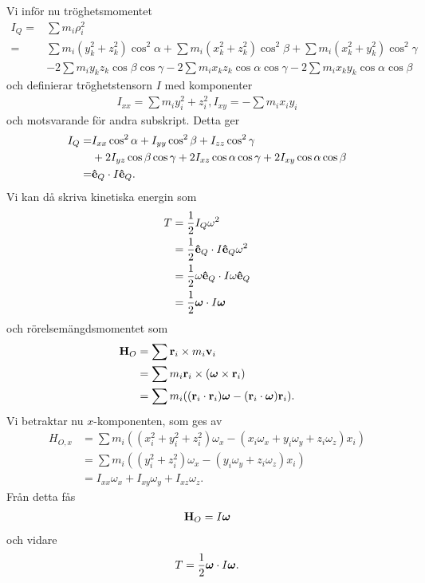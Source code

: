 Vi inför nu tröghetsmomentet
\begin{align*}
	I_{Q} =& \sum m_{i}\rho_{i}^2 \\
	      =& \sum m_{i}(y_{k}^2 + z_{k}^2)\cos^{2}{\alpha} + \sum m_{i}(x_{k}^2 + z_{k}^2)\cos^{2}{\beta} + \sum m_{i}(x_{k}^2 + y_{k}^2)\cos^{2}{\gamma} \\
	       &- 2\sum m_{i}y_{k}z_{k}\cos{\beta}\cos{\gamma} - 2\sum m_{i}x_{k}z_{k}\cos{\alpha}\cos{\gamma} - 2\sum m_{i}x_{k}y_{k}\cos{\alpha}\cos{\beta}
\end{align*}
och definierar tröghetstensorn $I$ med komponenter
\begin{align*}
	I_{xx} = \sum m_{i}y_{i}^2 + z_{i}^2, I _{xy} = -\sum m_{i}x_{i}y_{i} 
\end{align*}
och motsvarande för andra subskript. Detta ger
\begin{align*}
	I_{Q} =& I_{xx}\cos^{2}{\alpha} + I_{yy}\cos^{2}{\beta} + I_{zz}\cos^{2}{\gamma} \\
	       &+ 2I_{yz}\cos{\beta}\cos{\gamma} + 2I_{xz}\cos{\alpha}\cos{\gamma} + 2I_{xy}\cos{\alpha}\cos{\beta} \\
	      =& \vu{e}_{Q}\cdot I\vu{e}_{Q}.
\end{align*}
Vi kan då skriva kinetiska energin som
\begin{align*}
	T &= \frac{1}{2}I_{Q}\omega^2 \\
	  &= \frac{1}{2}\vu{e}_{Q}\cdot I\vu{e}_{Q}\omega^2 \\
	  &= \frac{1}{2}\omega\vu{e}_{Q}\cdot I\omega\vu{e}_{Q} \\
	  &= \frac{1}{2}\vb*{\omega}\cdot I\vb*{\omega}
\end{align*}
och rörelsemängdsmomentet som
\begin{align*}
	\vb{H}_{O} &= \sum \vb{r}_{i}\times m_{i}\vb{v}_{i} \\
	           &= \sum m_{i}\vb{r}_{i}\times(\vb*{\omega}\times\vb{r}_{i}) \\
	           &= \sum m_{i}((\vb{r}_{i}\cdot\vb{r}_{i})\vb*{\omega} - (\vb{r}_{i}\cdot\vb*{\omega})\vb{r}_{i}).
\end{align*}
Vi betraktar nu $x$-komponenten, som ges av
\begin{align*}
	H_{O, x} &= \sum m_{i}((x_{i}^2 + y_{i}^2 + z_{i}^2)\omega_{x} - (x_{i}\omega_{x} + y_{i}\omega_{y} + z_{i}\omega_{z})x_{i}) \\
	         &= \sum m_{i}((y_{i}^2 + z_{i}^2)\omega_{x} - (y_{i}\omega_{y} + z_{i}\omega_{z})x_{i}) \\
	         &= I_{xx}\omega_{x} + I_{xy}\omega_{y} + I_{xz}\omega_{z}.
\end{align*}
Från detta fås
\begin{align*}
	\vb{H}_{O} = I\vb*{\omega}
\end{align*}
och vidare
\begin{align*}
	T = \frac{1}{2}\vb*{\omega}\cdot I\vb*{\omega}.
\end{align*}

